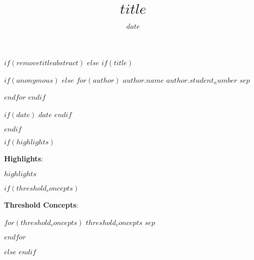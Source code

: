 \documentclass[$if(fontsize)$$fontsize$,$endif$$if(lang)$$babel-lang$,$endif$$if(papersize)$$papersize$,$endif$$for(classoption)$$classoption$$sep$,$endfor$]{article}
\title{$title$}
\date{$date$}
\newcommand*{\authorfont}{\fontfamily{phv}\selectfont}
\renewenvironment{abstract}
 {{%
    \setlength{\leftmargin}{0mm}
    \setlength{\rightmargin}{\leftmargin}%
  }%
  \relax}
 {\endlist}
\begin{document}

$if(removetitleabstract)$
$else$
$if(title)$

{%
\setlength{\parindent}{0pt}
\thispagestyle{plain}
{\fontsize{18}{20}\selectfont\raggedright
\maketitle  %

}

{
   \vskip 13.5pt\relax \normalsize\fontsize{11}{12}
   $if(anonymous)$
      \hfill
   $else$
      $for(author)$
         \textbf{\authorfont $author.name$} \hskip 15pt \emph{\small $author.student_number$}  $sep$ \par
      $endfor$
   $endif$

}
{
   \vskip 13.5pt\relax \normalsize\fontsize{11}{12}
   $if(date)$
      \small{$date$}
      $endif$
}

}

$endif$


$if(highlights)$

\begin{abstract}

    \hbox{\vrule height .8pt width 39.14pc}

    \vskip 8.5pt %

    \noindent \textbf{Highlights}: \vskip 4pt

    $highlights$

    $if(threshold_concepts)$

    \vskip 8.5pt
    \noindent \textbf{Threshold Concepts}: \vskip 4pt

    $for(threshold_concepts)$
    $threshold_concepts$ $sep$ \par
    $endfor$ \par

    \hbox{\vrule height .8pt width 39.14pc}

    $else$
    \hbox{\vrule height .8pt width 39.14pc}
    $endif$

\end{abstract}
\end{document}
